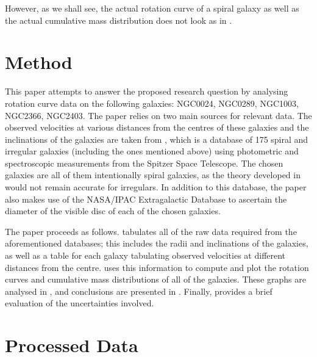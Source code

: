\documentclass{article}
\begin{document}
However, as we shall see, the actual rotation curve of a spiral galaxy as well as the actual cumulative mass distribution does not look as in .


\section{Method}\label{sec:method}

This paper attempts to answer the proposed research question by analysing rotation curve data on the following galaxies: NGC0024, NGC0289, NGC1003, NGC2366, NGC2403.
The paper relies on two main sources for relevant data.
The observed velocities at various distances from the centres of these galaxies and the inclinations of the galaxies are taken from \Cite{SPARC}, which is a database of 175 spiral and irregular galaxies (including the ones mentioned above) using photometric and spectroscopic measurements from the Spitzer Space Telescope.
The chosen galaxies are all of them intentionally spiral galaxies, as the theory developed in  would not remain accurate for irregulars.
In addition to this database, the paper also makes use of the NASA/IPAC Extragalactic Database to ascertain the diameter of the visible disc of each of the chosen galaxies.

The paper proceeds as follows.
 tabulates all of the raw data required from the aforementioned databases; this includes the radii and inclinations of the galaxies, as well as a table for each galaxy tabulating observed velocities at different distances from the centre.
 uses this information to compute and plot the rotation curves and cumulative mass distributions of all of the galaxies.
These graphs are analysed in , and conclusions are presented in .
Finally,  provides a brief evaluation of the uncertainties involved.

\section{Processed Data}\label{sec:processed-data}
\end{document}
